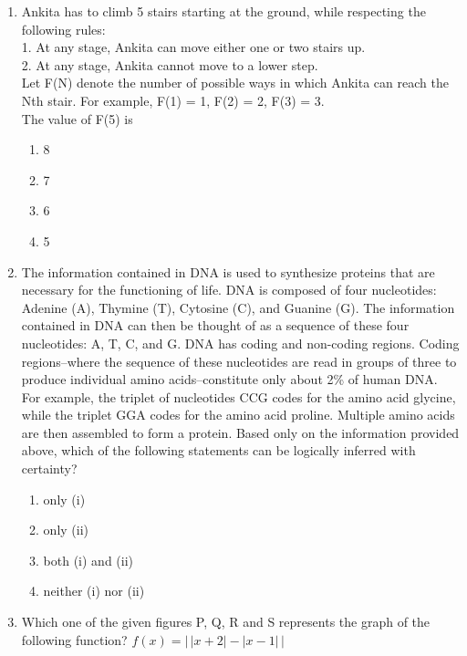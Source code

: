 \documentclass[journal,12pt,onecolumn]{IEEEtran}
\theoremstyle{remark}
\begin{document}
\begin{enumerate}
\item Ankita has to climb 5 stairs starting at the ground, while respecting the following rules:  \\
1. At any stage, Ankita can move either one or two stairs up.  \\
2. At any stage, Ankita cannot move to a lower step.\\  
Let F(N) denote the number of possible ways in which Ankita can reach the Nth stair. For example, F(1) = 1, F(2) = 2, F(3) = 3.\\
The value of F(5) is \underline{\hspace{10mm}}
\begin{enumerate}
\item 8
\item 7
\item 6
\item 5
\end{enumerate}
\vspace{0.5cm}

\item The information contained in DNA is used to synthesize proteins that are necessary for the functioning of life. DNA is composed of four nucleotides: Adenine (A), Thymine (T), Cytosine (C), and Guanine (G). The information contained in DNA can then be thought of as a sequence of these four nucleotides: A, T, C, and G. DNA has coding and non-coding regions. Coding regions--where the sequence of these nucleotides are read in groups of three to produce individual amino acids--constitute only about 2\% of human DNA. For example, the triplet of nucleotides CCG codes for the amino acid glycine, while the triplet GGA codes for the amino acid proline. Multiple amino acids are then assembled to form a protein. Based only on the information provided above, which of the following statements can be logically inferred with certainty?
\begin{enumerate}
\item only (i)
\item only (ii)
\item both (i) and (ii)
\item neither (i) nor (ii)
\end{enumerate}
\vspace{0.5cm}

\item Which one of the given figures P, Q, R and S represents the graph of the following function?  
$f(x) = \left|\,|x+2| - |x-1|\,\right|$


\end{enumerate}
\end{document}
